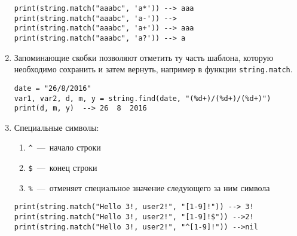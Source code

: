 \begin{enumerate}
\begin{lstlisting}
print(string.match("aaabc", 'a*')) --> aaa
print(string.match("aaabc", 'a-')) --> 
print(string.match("aaabc", 'a+')) --> aaa
print(string.match("aaabc", 'a?')) --> a
\end{lstlisting}
	
	\item Запоминающие скобки позволяют отметить ту часть шаблона, которую необходимо сохранить и затем вернуть, например в функции \lstinline{string.match}.

\begin{lstlisting}
date = "26/8/2016"
var1, var2, d, m, y = string.find(date, "(%d+)/(%d+)/(%d+)")
print(d, m, y)  --> 26  8  2016
\end{lstlisting}

	\item Специальные символы:
			\begin{enumerate}
				\item \lstinline{^}~---~начало строки
				\item \lstinline{$}~---~конец строки
				\item \lstinline{%}~---~отменяет специальное значение следующего за ним символа
			\end{enumerate}

\begin{lstlisting}
print(string.match("Hello 3!, user2!", "[1-9]!")) --> 3!
print(string.match("Hello 3!, user2!", "[1-9]!$")) -->2!
print(string.match("Hello 3!, user2!", "^[1-9]!")) -->nil
\end{lstlisting}

\end{enumerate}